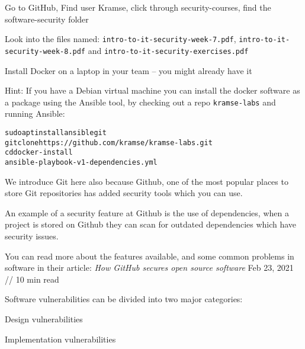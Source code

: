 \documentclass[Screen16to9,17pt]{foils}
\begin{document}

\begin{list2}
\item Go to GitHub, Find user Kramse, click through security-courses, find the software-security folder\\
\item Look into the files named: \verb+intro-to-it-security-week-7.pdf+, \verb+intro-to-it-security-week-8.pdf+ and \verb+intro-to-it-security-exercises.pdf+
\item Install Docker on a laptop in your team -- you might already have it
\end{list2}

Hint: If you have a Debian virtual machine you can install the docker software as a package using the Ansible tool, by checking out a repo \verb+kramse-labs+ and running Ansible:
\begin{alltt}
sudo apt install ansible git
git clone https://github.com/kramse/kramse-labs.git
cd docker-install
ansible-playbook -v 1-dependencies.yml
\end{alltt}


We introduce Git here also because Github, one of the most popular places to store Git repositories has added security tools which you can use.

An example of a security feature at Github is the use of dependencies, when a project is stored on Github they can scan for outdated dependencies which have security issues.

You can read more about the features available, and some common problems in software in their article:
\emph{How GitHub secures open source software}
Feb 23, 2021 // 10 min read\\






Software vulnerabilities can be divided into two major categories:
\begin{list2}
\item Design vulnerabilities
\item Implementation vulnerabilities
\end{list2}
\end{document}
